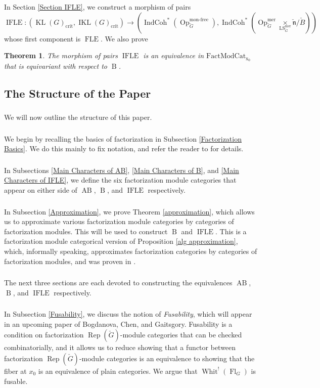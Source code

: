 \documentclass[10pt,a4paper]{amsart}
\newtheorem{thm}[subsubsection]{Theorem}
\newcommand{\on}[1]{\operatorname{#1}}
\newcommand{\IndCoh}{\on{IndCoh}}
\newcommand{\Gcheck}{\check{G}}
\newcommand{\ncheck}{\check{\mathfrak{n}}}
\newcommand{\Bcheck}{\check{B}}
\newcommand{\FactModCat}{\on{FactModCat_{x_0}}}
\newcommand{\sssec}[1]{\subsubsection{}}
\begin{document}
\sssec{}
In Section \ref{Section IFLE}, we construct a morphism of pairs
$$
\on{IFLE} : (\on{KL}(G)_{\on{crit}}, \on{IKL}(G)_{\on{crit}}) \longrightarrow (\IndCoh^*(\on{Op}_{\Gcheck}^{\on{mon-free}}), \IndCoh^*(\on{Op}_{\Gcheck}^{\on{mer}} \underset{\on{LS}_{\Gcheck}^{\on{mer}}}{\times} \ncheck/\Bcheck))
$$
whose first component is $\on{FLE}$. We also prove
\begin{thm} \label{Theorem IFLE}
    The morphism of pairs $\on{IFLE}$ is an equivalence in $\FactModCat$ that is equivariant with respect to $\on{B}$.
\end{thm}

\subsection{The Structure of the Paper}
\sssec{}
We will now outline the structure of this paper.

\sssec{}
We begin by recalling the basics of factorization in Subsection \ref{Factorization Basics}. We do this mainly to fix notation, and refer the reader to \cite{factorization} for details.

\sssec{}
In Subsections \ref{Main Characters of AB}, \ref{Main Characters of B}, and \ref{Main Characters of IFLE}, we define the six factorization module categories that appear on either side of $\on{AB}$, $\on{B}$, and $\on{IFLE}$ respectively.

\sssec{}
In Subsection \ref{Approximation}, we prove Theorem \ref{approximation}, which allows us to approximate various factorization module categories by categories of factorization modules. This will be used to construct $\on{B}$ and $\on{IFLE}$. This is a factorization module categorical version of Proposition \ref{alg approximation}, which, informally speaking, approximates factorization categories by categories of factorization modules, and was proven in \cite{GLC2}.

\sssec{}
The next three sections are each devoted to constructing the equivalences $\on{AB}$, $\on{B}$, and $\on{IFLE}$ respectively.

\sssec{}
In Subsection \ref{Fusability}, we discuss the notion of \emph{Fusability}, which will appear in an upcoming paper \cite{BCG} of Bogdanova, Chen, and Gaitsgory. Fusability is a condition on factorization $\on{Rep}(\Gcheck)$-module categories that can be checked combinatorially, and it allows us to reduce showing that a functor between factorization $\on{Rep}(\Gcheck)$-module categories is an equivalence to showing that the fiber at $x_0$ is an equivalence of plain categories. We argue that $\on{Whit}^!(\on{Fl}_G)$ is fusable.
\end{document}
